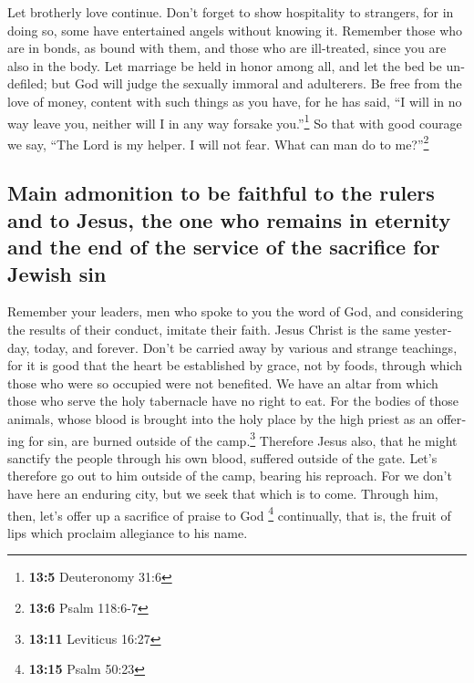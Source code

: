 \begin{paracol}{2}
\begin{otherlanguage}{english}
 Let brotherly love continue.  Don't forget
to show hospitality to strangers, for in doing so, some have entertained
angels without knowing it.  Remember those who are in
bonds, as bound with them, and those who are ill-treated, since you are
also in the body.  Let marriage be held in honor among
all, and let the bed be undefiled; but God will judge the sexually
immoral and adulterers.  Be free from the love of money,
content with such things as you have, for he has said, ``I will in no
way leave you, neither will I in any way forsake you.''\footnote{\textbf{13:5}
  Deuteronomy 31:6}  So that with good courage we say,
``The Lord is my helper. I will not fear. What can man do to
me?''\footnote{\textbf{13:6} Psalm 118:6-7}

\hypertarget{main-admonition-to-be-faithful-to-the-rulers-and-to-jesus-the-one-who-remains-in-eternity-and-the-end-of-the-service-of-the-sacrifice-for-jewish-sin}{%
\subsection{Main admonition to be faithful to the rulers and to Jesus,
the one who remains in eternity and the end of the service of the
sacrifice for Jewish
sin}\label{main-admonition-to-be-faithful-to-the-rulers-and-to-jesus-the-one-who-remains-in-eternity-and-the-end-of-the-service-of-the-sacrifice-for-jewish-sin}}

 Remember your leaders, men who spoke to you the word of
God, and considering the results of their conduct, imitate their faith.
 Jesus Christ is the same yesterday, today, and forever.
 Don't be carried away by various and strange teachings,
for it is good that the heart be established by grace, not by foods,
through which those who were so occupied were not benefited.
 We have an altar from which those who serve the holy
tabernacle have no right to eat.  For the bodies of those
animals, whose blood is brought into the holy place by the high priest
as an offering for sin, are burned outside of the camp.\footnote{\textbf{13:11}
  Leviticus 16:27}  Therefore Jesus also, that he might
sanctify the people through his own blood, suffered outside of the gate.
 Let's therefore go out to him outside of the camp,
bearing his reproach.  For we don't have here an enduring
city, but we seek that which is to come.  Through him,
then, let's offer up a sacrifice of praise to God \footnote{\textbf{13:15}
  Psalm 50:23} continually, that is, the fruit of lips which proclaim
allegiance to his name.


\end{otherlanguage}
\end{paracol}
